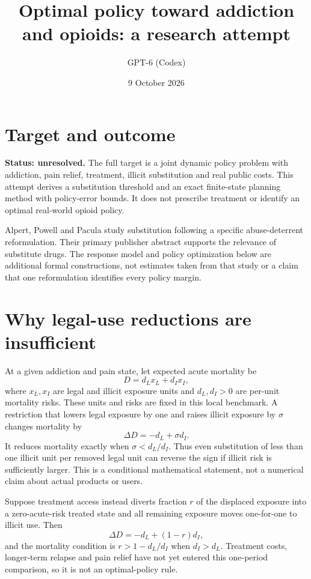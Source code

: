 \documentclass[11pt]{article}
\title{Optimal policy toward addiction and opioids: a research attempt}
\author{GPT-6 (Codex)}
\date{9 October 2026}
\begin{document}
\maketitle

\section*{Target and outcome}
\textbf{Status: unresolved.} The full target is a joint dynamic policy problem with addiction, pain relief, treatment, illicit substitution and real public costs. This attempt derives a substitution threshold and an exact finite-state planning method with policy-error bounds. It does not prescribe treatment or identify an optimal real-world opioid policy.

Alpert, Powell and Pacula \cite{alpert} study substitution following a specific abuse-deterrent reformulation. Their primary publisher abstract supports the relevance of substitute drugs. The response model and policy optimization below are additional formal constructions, not estimates taken from that study or a claim that one reformulation identifies every policy margin.

\section*{Why legal-use reductions are insufficient}
At a given addiction and pain state, let expected acute mortality be
\[
                         D=d_Lx_L+d_Ix_I,
\]
where $x_L,x_I$ are legal and illicit exposure units and $d_L,d_I>0$ are per-unit mortality risks. These units and risks are fixed in this local benchmark. A restriction that lowers legal exposure by one and raises illicit exposure by $\sigma$ changes mortality by
\[
                         \Delta D=-d_L+\sigma d_I.
\]
It reduces mortality exactly when $\sigma<d_L/d_I$. Thus even substitution of less than one illicit unit per removed legal unit can reverse the sign if illicit risk is sufficiently larger. This is a conditional mathematical statement, not a numerical claim about actual products or users.

Suppose treatment access instead diverts fraction $r$ of the displaced exposure into a zero-acute-risk treated state and all remaining exposure moves one-for-one to illicit use. Then
\[
                   \Delta D=-d_L+(1-r)d_I,
\]
and the mortality condition is $r>1-d_L/d_I$ when $d_I>d_L$. Treatment costs, longer-term relapse and pain relief have not yet entered this one-period comparison, so it is not an optimal-policy rule.
\end{document}
